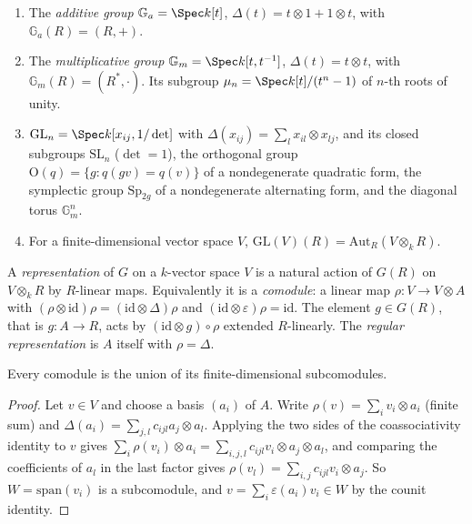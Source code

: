 \begin{example}\label{algebraic-groups:example-groups}
\begin{enumerate}
\item The \emph{additive group} $\mathbb{G}_a = \Spec k[t]$, $\Delta(t) = t \otimes 1 + 1 \otimes t$, with $\mathbb{G}_a(R) = (R, +)$.
\item The \emph{multiplicative group} $\mathbb{G}_m = \Spec k[t, t^{-1}]$, $\Delta(t) = t \otimes t$, with $\mathbb{G}_m(R) = (R^*, \cdot)$. Its subgroup $\mu_n = \Spec k[t]/(t^n - 1)$ of
$n$-th roots of unity.
\item $\mathrm{GL}_n = \Spec k[x_{ij}, 1/\det]$ with $\Delta(x_{ij}) = \sum_lx_{il} \otimes x_{lj}$, and its closed subgroups $\mathrm{SL}_n$ ($\det = 1$), the orthogonal group
$\mathrm{O}(q) = \{g : q(gv) = q(v)\}$ of a nondegenerate quadratic form, the symplectic group $\mathrm{Sp}_{2g}$ of a nondegenerate alternating form, and the
diagonal torus $\mathbb{G}_m^n$.
\item For a finite-dimensional vector space $V$, $\mathrm{GL}(V)(R) = \mathrm{Aut}_R(V \otimes_kR)$.
\end{enumerate}
\end{example}

\begin{definition}\label{algebraic-groups:definition-representation}
A \emph{representation} of $G$ on a $k$-vector space $V$ is a natural action of $G(R)$ on $V \otimes_kR$ by $R$-linear maps. Equivalently it is a \emph{comodule}: a linear map
$\rho \colon V \to V \otimes A$ with $(\rho \otimes \mathrm{id})\rho = (\mathrm{id} \otimes \Delta)\rho$ and $(\mathrm{id} \otimes \varepsilon)\rho = \mathrm{id}$. The element $g \in G(R)$,
that is $g \colon A \to R$, acts by $(\mathrm{id} \otimes g) \circ \rho$ extended $R$-linearly. The \emph{regular representation} is $A$ itself with $\rho = \Delta$.
\end{definition}

\begin{lemma}\label{algebraic-groups:lemma-locally-finite}
Every comodule is the union of its finite-dimensional subcomodules.
\end{lemma}

\begin{proof}
Let $v \in V$ and choose a basis $(a_i)$ of $A$. Write $\rho(v) = \sum_iv_i \otimes a_i$ (finite sum) and $\Delta(a_i) = \sum_{j,l}c_{ijl}a_j \otimes a_l$. Applying the two sides of
the coassociativity identity to $v$ gives $\sum_i\rho(v_i) \otimes a_i = \sum_{i,j,l}c_{ijl}v_i \otimes a_j \otimes a_l$, and comparing the coefficients of $a_l$ in the last factor gives
$\rho(v_l) = \sum_{i,j}c_{ijl}v_i \otimes a_j$. So $W = \mathrm{span}(v_i)$ is a subcomodule, and $v = \sum_i\varepsilon(a_i)v_i \in W$ by the counit identity.
\end{proof}

